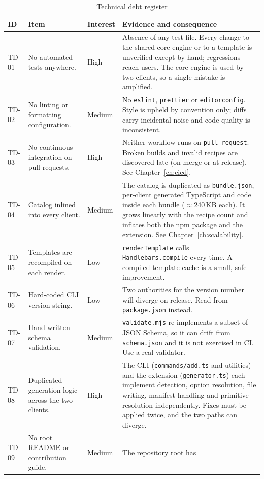 \begin{longtable}{p{1.2cm}p{3.6cm}p{1.7cm}p{7.1cm}}
\caption{Technical debt register}\\
\toprule
\textbf{ID} & \textbf{Item} & \textbf{Interest} & \textbf{Evidence and consequence} \\
\midrule

TD-01 & No automated tests anywhere. & High & Absence of any test file. Every
change to the shared core engine or to a template is unverified except by hand;
regressions reach users. The core engine is used by two clients, so a single
mistake is amplified. \\
TD-02 & No linting or formatting configuration. & Medium & No \texttt{eslint},
\texttt{prettier} or \texttt{editorconfig}. Style is upheld by convention only;
diffs carry incidental noise and code quality is inconsistent. \\
TD-03 & No continuous integration on pull requests. & High & Neither workflow runs
on \texttt{pull\_request}. Broken builds and invalid recipes are discovered late
(on merge or at release). See Chapter~\ref{ch:cicd}. \\
TD-04 & Catalog inlined into every client. & Medium & The catalog is duplicated as
\texttt{bundle.json}, per-client generated TypeScript and code inside each bundle
($\approx$240\,KB each). It grows linearly with the recipe count and inflates
both the npm package and the extension. See Chapter~\ref{ch:scalability}. \\
TD-05 & Templates are recompiled on each render. & Low & \texttt{renderTemplate}
calls \texttt{Handlebars.compile} every time. A compiled-template cache is a
small, safe improvement. \\
TD-06 & Hard-coded CLI version string. & Low & Two authorities for the version
number will diverge on release. Read from \texttt{package.json} instead. \\
TD-07 & Hand-written schema validation. & Medium & \texttt{validate.mjs}
re-implements a subset of JSON Schema, so it can drift from
\texttt{schema.json} and it is not exercised in CI. Use a real validator. \\
TD-08 & Duplicated generation logic across the two clients. & High & The CLI
(\texttt{commands/add.ts} and utilities) and the extension
(\texttt{generator.ts}) each implement detection, option resolution, file
writing, manifest handling and primitive resolution independently. Fixes must be
applied twice, and the two paths can diverge. \\
TD-09 & No root README or contribution guide. & Medium & The repository root has

\end{longtable}
